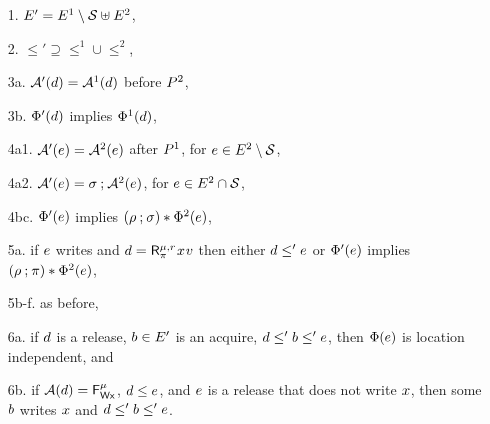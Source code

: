 \begin{definition}
\begin{enumerate}
\item[1.] $\Event' = \Event^1\setminus\Sub \uplus \Event^2$,
\item[2.] ${\le'}\supseteq{\le^1}\cup{\le^2}$, 
\item[3a.] $\labelingAct'(\bEv) = \labelingAct^1(\bEv)$ before $\aPS^2$,
\item[3b.] $\labelingForm'(\bEv)$ implies $\labelingForm^1(\bEv)$,
\item[4a1.] $\labelingAct'(\aEv) = \labelingAct^2(\aEv)$  after $\aPS^1$,  for $\aEv\in\Event^2\setminus\Sub$,
\item[4a2.] $\labelingAct'(\aEv) =  \aSubC\SUBSEQ\labelingAct^2(\aEv)$,  for $\aEv\in\Event^2\cap\Sub$, 
\item[4bc.] $\labelingForm'(\aEv)$ implies
  $(\SUBDRS{\aPS^1} \SUBSEQ \aSubC)\SUBAPP\labelingForm^2(\aEv)$, 
\item[5a.] if $\aEv$ writes and
  $\bEv=\DRreg[\amode]{\aReg}{\bSub}{\aLoc}{\aVal}$
  then either $\bEv\le'\aEv$ or
  $\labelingForm'(\aEv)$ implies  
  $(\SUBDRS{\aPS^1}\SUBSEQ \bSub)\SUBAPP\labelingForm^2(\aEv)$,
\item[5b-f.] as before,
\item[6a.] if $\bEv$ is a release, $\dEv\in\Event'$ is an acquire,
  $\bEv\le'\dEv\le'\aEv$, then $\labelingForm(\aEv)$ is location independent, and
\item[6b.] if $\labelingAct(\bEv)=\DFW[\aLoc]{\amode}$, $\bEv\le\aEv$, and
  $\aEv$ is a release that does not write $\aLoc$, then  some
  $\dEv$ writes $\aLoc$ and $\bEv\le'\dEv\le'\aEv$. %

\end{enumerate}
\end{definition}
